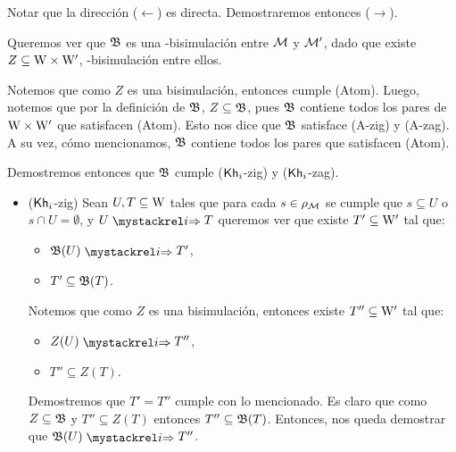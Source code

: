 \begin{demostracion}

    Notar que la dirección ($\leftarrow$) es directa. Demostraremos entonces ($\rightarrow$).

    Queremos ver que $\mathfrak{B}$ es una \KHilogic-bisimulación entre $\mathcal{M}$ y $\mathcal{M}'$,
    dado que existe $Z \subseteq \mathrm{W} \times \mathrm{W}'$, \KHilogic-bisimulación entre ellos.

    Notemos que como $Z$ es una bisimulación, entonces cumple (Atom). Luego, notemos que
    por la definición de $\mathfrak{B}$, $Z \subseteq \mathfrak{B}$, pues $\mathfrak{B}$ contiene todos los pares de
    $\mathrm{W} \times \mathrm{W}'$ que satisfacen (Atom). Esto nos dice que $\mathfrak{B}$ satisface (A-zig) y (A-zag).
    A su vez, cómo mencionamos, $\mathfrak{B}$ contiene todos los pares que satisfacen (Atom).

    Demostremos entonces que $\mathfrak{B}$ cumple ($\mathsf{Kh}_i$-zig) y ($\mathsf{Kh}_i$-zag).

    \begin{itemize}
        \item ($\mathsf{Kh}_i$-zig) Sean $U,T \subseteq \mathrm{W}$ tales que para cada $s \in \rho_{\mathcal{M}}$ se cumple que $s \subseteq U$ 
        o $s \cap U = \emptyset$, y $U \ultsExecAgi T$ queremos ver que existe $T' \subseteq \mathrm{W}'$ tal que:
    
        \begin{multicols}{2}
            \begin{itemize}
                \item $\universalbis(U) \ultsExecAgi T'$, 
                \item $T' \subseteq \mathfrak{B}(T)$.
            \end{itemize}
        \end{multicols}
    
        Notemos que como $Z$ es una bisimulación, entonces existe $T'' \subseteq \mathrm{W}'$ tal que:
    
        \begin{multicols}{2}
            \begin{itemize}
                \item $Z(U) \ultsExecAgi T''$, 
                \item $T'' \subseteq Z(T)$.
            \end{itemize}
        \end{multicols}
    
        Demostremos que $T' = T''$ cumple con lo mencionado. Es claro que como $Z \subseteq \mathfrak{B}$ y 
        $T'' \subseteq Z(T)$ entonces $T'' \subseteq \mathfrak{B}(T)$. Entonces, nos queda demostrar que $\universalbis(U) \ultsExecAgi T''$.
    

\end{itemize}
\end{demostracion}
